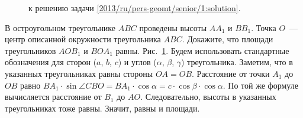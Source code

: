 \ifsolution
\begin{figure}\centering
    \caption{к решению задачи \ref{2013/ru/pers-geomt/senior/1:solution}.}
    \label{2013/ru/pers-geomt/senior/1:solution:fig}
\end{figure}%
\fi %

\problem
В остроугольном треугольнике $ABC$ проведены высоты $A A_1$ и $B B_1$.
Точка $O$~--- центр описанной окружности треугольника $ABC$.
Докажите, что площади треугольников $A O B_1$ и $B O A_1$ равны.
\solution
\label{2013/ru/pers-geomt/senior/1:solution}%
Рис.~\ref{2013/ru/pers-geomt/senior/1:solution:fig}.
Будем использовать стандартные обозначения для сторон ($a$, $b$, $c$) и
углов ($\alpha$, $\beta$, $\gamma$) треугольника.
Заметим, что в указанных треугольниках равны стороны $OA = OB$.
Расстояние от точки $A_1$ до $OB$ равно
\(
    B A_1 \cdot \sin \angle CBO
=
    B A_1 \cdot \cos \alpha
=
    c \cdot \cos \beta \cdot \cos \alpha
\).
По той же формуле вычисляется расстояние от $B_1$ до $AO$.
Следовательно, высоты в указанных треугольниках тоже равны.
Значит, равны и площади.
\endproblem
